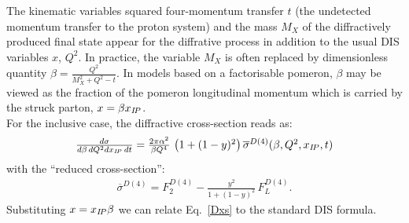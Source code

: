 The kinematic variables squared four-momentum transfer $t$
(the undetected momentum transfer to the proton system) and
the mass $M_X$ of the diffractively produced final state 
appear for the diffrative process in addition to the usual DIS variables $x$, $Q^2$.
In practice, the variable $M_X$ 
is often replaced by dimensionless quantity $\beta=\frac{Q^2}{M_X^2+Q^2-t}$.
%
In models based on a factorisable pomeron, $\beta$ may be viewed as the fraction of the
pomeron longitudinal momentum which is carried by the struck parton, $x=\beta x_{{I\!P}}$.
\\
For the inclusive case, the diffractive cross-section reads as:
\begin{equation}
\begin{array}{lcl}
  \frac{d\sigma}{d\beta\,dQ^2dx_{{I\!P}}\,dt}
=
  \frac{2\pi\alpha^2}{\beta Q^4}\,
    \left( 1 +  (1-y)^2 \right) \overline\sigma^{D(4)}(\beta,Q^2,x_{{I\!P}},t)
\label{Dxs}
\end{array}
\end{equation}
with the ``reduced cross-section'': 
\begin{equation}
\begin{array}{lcl}
\overline\sigma^{D(4)}
 = F_2^{D(4)} - \frac{y^2}{1 +  (1-y)^2}\, F_L^{D(4)}.
\label{eq:sigred}
\end{array}
\end{equation}
Substituting $x = x_{{I\!P}}\beta$ we can relate Eq.~\ref{Dxs} to the standard DIS formula.
